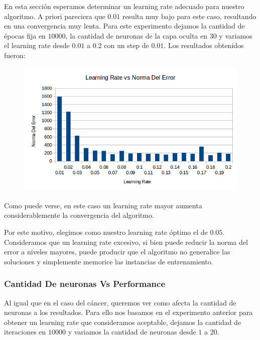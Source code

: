 En esta sección esperamos determinar un learning rate adecuado para nuestro algoritmo. A priori pareciera que $0.01$ resulta muy bajo para este caso, resultando en una convergencia muy lenta. Para este experimento dejamos la cantidad de épocas fija en $10000$, la cantidad de neuronas de la capa oculta en $30$ y variamos el learning rate desde $0.01$ a $0.2$ con un step de $0.01$. Los resultados obtenidos fueron:

\begin{figure}[h!]
  \centering
    \includegraphics[scale=0.4]{ej2/test_learning_rate.png}
\end{figure}

Como puede verse, en este caso un learning rate mayor aumenta considerablemente la convergencia del algoritmo.

Por este motivo, elegimos como nuestro learning rate óptimo el de $0.05$. Consideramos que un learning rate excesivo, si bien puede reducir la norma del error a niveles mayores, puede producir que el algoritmo no generalice las soluciones y simplemente memorice las instancias de entrenamiento.

\subsubsection{Cantidad De neuronas Vs Performance}

Al igual que en el caso del cáncer, queremos ver como afecta la cantidad de neuronas a los resultados. Para ello nos basamos en el experimento anterior para obtener un learning rate que consideramos aceptable, dejamos la cantidad de iteraciones en $10000$ y variamos la cantidad de neuronas desde $1$ a $20$.

